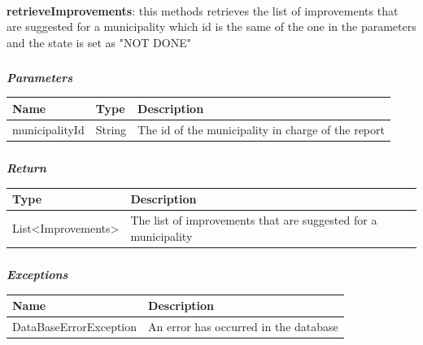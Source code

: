 					\paragraph{}
							\textbf{retrieveImprovements}: this methods retrieves the list of improvements that are suggested for a municipality which id is the same of the one in the parameters  and the state is set as "NOT DONE"
							\subparagraph{}
							\textit{\textbf{Parameters}}
								\begin{table}[!h]
									\begin{tabular}{L{0.2\textwidth}L{0.2\textwidth}L{0.2\textwidth}}
										\toprule
										Name & Type & Description \\
										\midrule
								  		municipalityId & String & The id of the municipality in charge of the report \\
								 		\bottomrule
									\end{tabular}
								\end{table}
							\subparagraph{}
								\textit{\textbf{Return}}
									\begin{table}[!h]
									\begin{tabular}{L{0.3\textwidth}L{0.3\textwidth}}
										\toprule
										Type & Description \\
										\midrule
								  		List<Improvements> & The list of improvements that are suggested for a municipality \\
								 		\bottomrule
									\end{tabular}
								\end{table}
							\subparagraph{}
								\textit{\textbf{Exceptions}}
									\begin{table}[!h]
									\begin{tabular}{L{0.3\textwidth}L{0.3\textwidth}}
										\toprule
										Name & Description \\
										\midrule
								  		DataBaseErrorException & An error has occurred in the database \\ 
								 		\bottomrule
									\end{tabular}
								\end{table}
								
